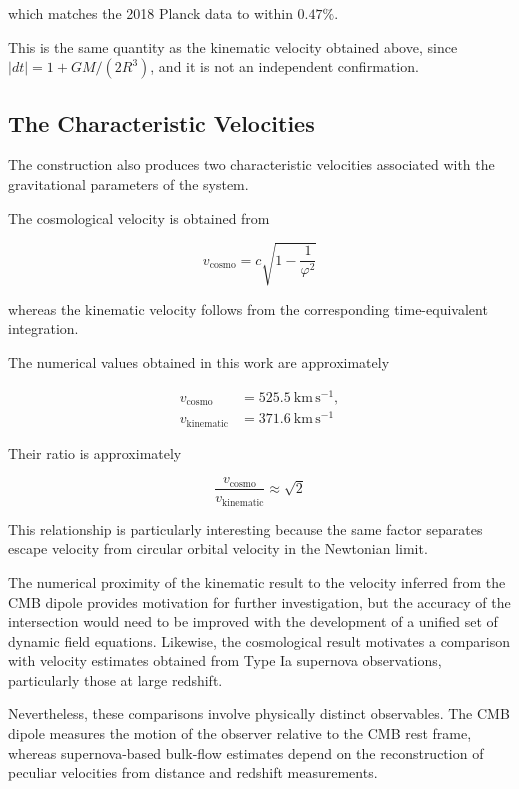 \documentclass[pdflatex,sn-mathphys-num]{sn-jnl}%
\theoremstyle{thmstyleone}%
\theoremstyle{thmstyletwo}%
\theoremstyle{thmstylethree}%
\begin{document}
\begin{appendices}
which matches the 2018 Planck data to within $0.47\%$.

This is the same quantity as the kinematic velocity obtained above, since $|dt|=1+GM/(2R^3)$, and it is not an independent confirmation.


\subsection{The Characteristic Velocities}

The construction also produces two characteristic velocities associated with the gravitational parameters of the system.

The cosmological velocity is obtained from

\begin{equation}
    v_{\mathrm{cosmo}}
    =
    c\sqrt{1-\frac{1}{\varphi^2}}
\end{equation}

whereas the kinematic velocity follows from the corresponding time-equivalent integration.

The numerical values obtained in this work are approximately

\begin{align}
    v_{\mathrm{cosmo}}
    &=
    525.5~\mathrm{km\,s^{-1}},\\
    v_{\mathrm{kinematic}}
    &=
    371.6~\mathrm{km\,s^{-1}}
\end{align}

Their ratio is approximately

\begin{equation}
    \frac{v_{\mathrm{cosmo}}}
    {v_{\mathrm{kinematic}}}
    \approx
    \sqrt{2}
\end{equation}

This relationship is particularly interesting because the same factor separates escape velocity from circular orbital velocity in the Newtonian limit.

The numerical proximity of the kinematic result to the velocity inferred from the CMB dipole provides motivation for further investigation, but the accuracy of the intersection would need to be improved with the development of a unified set of dynamic field equations. Likewise, the cosmological result motivates a comparison with velocity estimates obtained from Type Ia supernova observations, particularly those at large redshift.

Nevertheless, these comparisons involve physically distinct observables. The CMB dipole measures the motion of the observer relative to the CMB rest frame, whereas supernova-based bulk-flow estimates depend on the reconstruction of peculiar velocities from distance and redshift measurements.


\end{appendices}
\end{document}
